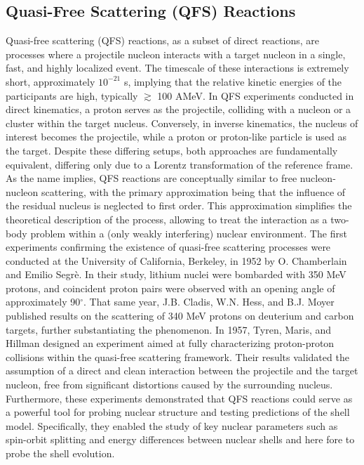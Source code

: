 \subsection{Quasi-Free Scattering (QFS) Reactions}\label{sec:qfs_theo}
Quasi-free scattering (QFS) reactions, as a subset of direct reactions, are processes where a projectile nucleon interacts with a target nucleon in a single, fast, and highly localized event. The timescale of these interactions is extremely short, approximately $10^{-21}$ s, implying that the relative kinetic energies of the participants are high, typically $\gtrsim$ 100 AMeV.\newline
In QFS experiments conducted in direct kinematics, a proton serves as the projectile, colliding with a nucleon or a cluster within the target nucleus. Conversely, in inverse kinematics, the nucleus of interest becomes the projectile, while a proton or proton-like particle is used as the target. Despite these differing setups, both approaches are fundamentally equivalent, differing only due to a Lorentz transformation of the reference frame.\newline
As the name implies, QFS reactions are conceptually similar to free nucleon-nucleon scattering, with the primary approximation being that the influence of the residual nucleus is neglected to first order. This approximation simplifies the theoretical description of the process, allowing to treat the interaction as a two-body problem within a (only weakly interfering) nuclear environment.\newline
The first experiments confirming the existence of quasi-free scattering processes were conducted at the University of California, Berkeley, in 1952 by O. Chamberlain and Emilio Segr\`e\cite{chamberlain1952proton}. In their study, lithium nuclei were bombarded with 350 MeV protons, and coincident proton pairs were observed with an opening angle of approximately 90$^{\circ}$. That same year, J.B. Cladis, W.N. Hess, and B.J. Moyer published results on the scattering of 340 MeV protons on deuterium and carbon targets\cite{cladis1952nucleon}, further substantiating the phenomenon.\newline
In 1957, Tyren, Maris, and Hillman designed an experiment aimed at fully characterizing proton-proton collisions within the quasi-free scattering framework\cite{MARIS19581}. Their results validated the assumption of a direct and clean interaction between the projectile and the target nucleon, free from significant distortions caused by the surrounding nucleus. Furthermore, these experiments demonstrated that QFS reactions could serve as a powerful tool for probing nuclear structure and testing predictions of the shell model. Specifically, they enabled the study of key nuclear parameters such as spin-orbit splitting and energy differences between nuclear shells and here fore to probe the shell evolution. \newline
